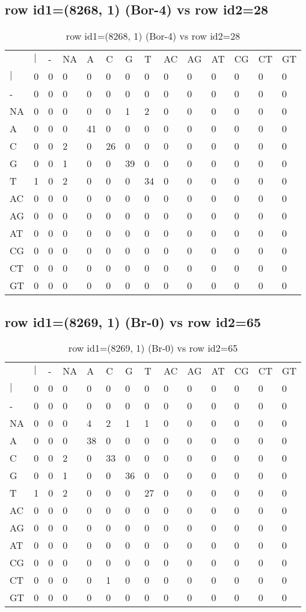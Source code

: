 \subsection{row id1=(8268, 1) (Bor-4) vs row id2=28}
\begin{center}
\begin{longtable}{|l|l|l|l|l|l|l|l|l|l|l|l|l|l|}
\caption{row id1=(8268, 1) (Bor-4) vs row id2=28} \label{table_dm218}\\
\hline
\\
\hline
&$|$&-&NA&A&C&G&T&AC&AG&AT&CG&CT&GT\\
$|$&0&0&0&0&0&0&0&0&0&0&0&0&0\\
-&0&0&0&0&0&0&0&0&0&0&0&0&0\\
NA&0&0&0&0&0&1&2&0&0&0&0&0&0\\
A&0&0&0&41&0&0&0&0&0&0&0&0&0\\
C&0&0&2&0&26&0&0&0&0&0&0&0&0\\
G&0&0&1&0&0&39&0&0&0&0&0&0&0\\
T&1&0&2&0&0&0&34&0&0&0&0&0&0\\
AC&0&0&0&0&0&0&0&0&0&0&0&0&0\\
AG&0&0&0&0&0&0&0&0&0&0&0&0&0\\
AT&0&0&0&0&0&0&0&0&0&0&0&0&0\\
CG&0&0&0&0&0&0&0&0&0&0&0&0&0\\
CT&0&0&0&0&0&0&0&0&0&0&0&0&0\\
GT&0&0&0&0&0&0&0&0&0&0&0&0&0\\
\hline
\end{longtable}
\end{center}

\subsection{row id1=(8269, 1) (Br-0) vs row id2=65}
\begin{center}
\begin{longtable}{|l|l|l|l|l|l|l|l|l|l|l|l|l|l|}
\caption{row id1=(8269, 1) (Br-0) vs row id2=65} \label{table_dm220}\\
\hline
\\
\hline
&$|$&-&NA&A&C&G&T&AC&AG&AT&CG&CT&GT\\
$|$&0&0&0&0&0&0&0&0&0&0&0&0&0\\
-&0&0&0&0&0&0&0&0&0&0&0&0&0\\
NA&0&0&0&4&2&1&1&0&0&0&0&0&0\\
A&0&0&0&38&0&0&0&0&0&0&0&0&0\\
C&0&0&2&0&33&0&0&0&0&0&0&0&0\\
G&0&0&1&0&0&36&0&0&0&0&0&0&0\\
T&1&0&2&0&0&0&27&0&0&0&0&0&0\\
AC&0&0&0&0&0&0&0&0&0&0&0&0&0\\
AG&0&0&0&0&0&0&0&0&0&0&0&0&0\\
AT&0&0&0&0&0&0&0&0&0&0&0&0&0\\
CG&0&0&0&0&0&0&0&0&0&0&0&0&0\\
CT&0&0&0&0&1&0&0&0&0&0&0&0&0\\
GT&0&0&0&0&0&0&0&0&0&0&0&0&0\\
\hline
\end{longtable}
\end{center}

